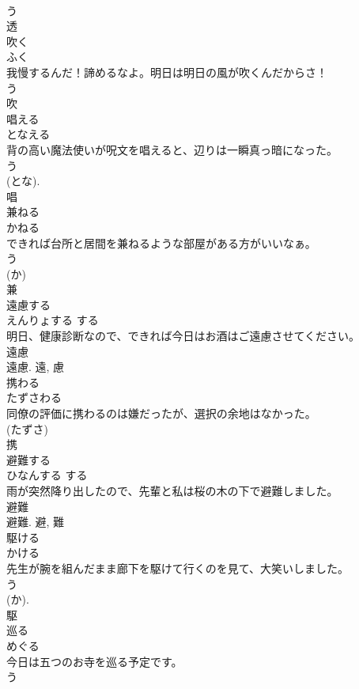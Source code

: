 \documentclass[8pt]{extreport}
\begin{document}
\begin{CJK}{UTF8}{min}
\\	う 
\\	透	
\\	吹く	
\\	ふく	
\\	我慢するんだ！諦めるなよ。明日は明日の風が吹くんだからさ！	
\\	う 
\\	吹	
\\	唱える	
\\	となえる	
\\	背の高い魔法使いが呪文を唱えると、辺りは一瞬真っ暗になった。	
\\	う 
\\	(とな). 
\\	唱	
\\	兼ねる	
\\	かねる	
\\	できれば台所と居間を兼ねるような部屋がある方がいいなぁ。	
\\	う 
\\	(か) 
\\	兼	
\\	遠慮する	
\\	えんりょする	する 
\\	明日、健康診断なので、できれば今日はお酒はご遠慮させてください。	
\\	遠慮 
\\	遠慮.	遠, 慮	
\\	携わる	
\\	たずさわる	
\\	同僚の評価に携わるのは嫌だったが、選択の余地はなかった。	
\\	(たずさ) 
\\	携	
\\	避難する	
\\	ひなんする	する 
\\	雨が突然降り出したので、先輩と私は桜の木の下で避難しました。	
\\	避難 
\\	避難.	避, 難	
\\	駆ける	
\\	かける	
\\	先生が腕を組んだまま廊下を駆けて行くのを見て、大笑いしました。	
\\	う 
\\	(か).
\\	駆	
\\	巡る	
\\	めぐる	
\\	今日は五つのお寺を巡る予定です。	
\\	う 

\end{CJK}
\end{document}
